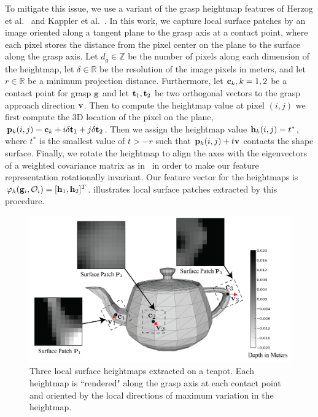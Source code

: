To mitigate this issue, we use a variant of the grasp heightmap features of Herzog et al.~\cite{herzog2012template} and Kappler et al.~\cite{kappler2015leveraging}.
In this work, we capture local surface patches by an image oriented along a tangent plane to the grasp axis at a contact point, where each pixel stores the distance from the pixel center on the plane to the surface along the grasp axis.
Let $d_g \in \mathbb{Z}$ be the number of pixels along each dimension of the heightmap, let $\delta \in \mathbb{R}$ be the resolution of the image pixels in meters, and let $r \in \mathbb{R}$ be a minimum projection distance.
Furthermore, let $\mathbf{c}_k, k = 1, 2$ be a contact point for grasp $\mathbf{g}$ and let $\mathbf{t}_1, \mathbf{t}_2$ be two orthogonal vectors to the grasp approach direction $\mathbf{v}$.
Then to compute the heightmap value at pixel $(i,j)$ we first compute the 3D location of the pixel on the plane, $\mathbf{p}_k(i,j) = \mathbf{c}_k + i \delta \mathbf{t}_1 + j \delta \mathbf{t}_2$.
Then we assign the heightmap value $\mathbf{h}_k(i,j) = t^*$, where $t^*$ is the smallest value of $t > -r$ such that $\mathbf{p}_k(i,j) + t \mathbf{v}$ contacts the shape surface.
Finally, we rotate the heightmap to align the axes with the eigenvectors of a weighted covariance matrix as in~\cite{tombariunique} in order to make our feature representation rotationally invariant.
Our feature vector for the heightmaps is $\varphi_{h}(\mathbf{g}_i, \mathcal{O}_i) = [\mathbf{h}_1, \mathbf{h}_2]^T$.
 illustrates local surface patches extracted by this procedure.

\begin{figure}[t!]
\centering
\includegraphics[scale=0.35]{figures/illustrations/local_feature_model.png}
\caption{Three local surface heightmaps extracted on a teapot. Each heightmap is ``rendered" along the grasp axis at each contact point and oriented by the local directions of maximum variation in the heightmap.  }
\vspace*{-15pt}
\end{figure}


